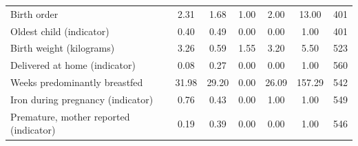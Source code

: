 \documentclass[12pt]{article}
\begin{document}
\begin{longtable}{l*{6}{c}}
Birth order         &        2.31&        1.68&        1.00&        2.00&       13.00&         401\\
Oldest child (indicator)&        0.40&        0.49&        0.00&        0.00&        1.00&         401\\
Birth weight (kilograms)&        3.26&        0.59&        1.55&        3.20&        5.50&         523\\
Delivered at home (indicator)&        0.08&        0.27&        0.00&        0.00&        1.00&         560\\
Weeks predominantly breastfed&       31.98&       29.20&        0.00&       26.09&      157.29&         542\\
Iron during pregnancy (indicator)&        0.76&        0.43&        0.00&        1.00&        1.00&         549\\
Premature, mother reported (indicator)&        0.19&        0.39&        0.00&        0.00&        1.00&         546\\


\end{longtable}
\end{document}
